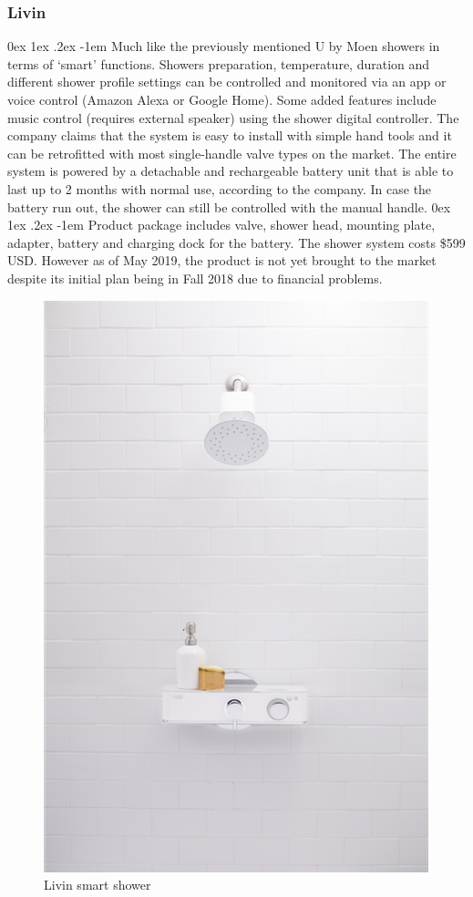 \documentclass[12pt, a4paper]{article}
\makeatletter
\renewcommand\paragraph{\@startsection{paragraph}{5}{\parindent}%
  {0ex \@plus1ex \@minus.2ex}%
  {-1em}%
  {\normalfont\normalsize\bfseries}}
\makeatother
\begin{document}
            \subsubsection{Livin\cite{livin}}
                \paragraph{}
                    Much like the previously mentioned U by Moen showers in terms of ‘smart’ functions. Showers preparation, 
                    temperature, duration and different shower profile settings can be controlled and monitored via an app or 
                    voice control (Amazon Alexa or Google Home). Some added features include music control (requires external 
                    speaker) using the shower digital controller. The company claims that the system is easy to install with 
                    simple hand tools and it can be retrofitted with most single-handle valve types on the market. The entire 
                    system is powered by a  detachable and rechargeable battery unit that is able to last up to 2 months with 
                    normal use, according to the company. In case the battery run out, the shower can still be controlled with 
                    the manual handle.
                \paragraph{}
                    Product package includes valve, shower head, mounting plate, adapter, battery and charging dock for the battery. 
                    The shower system costs \$599 USD. However as of May 2019, the product is not yet brought to the market despite 
                    its initial plan being in Fall 2018 due to financial problems.
                    \begin{figure}[H]
                        \centering
                        \includegraphics[width=0.4\linewidth]{img/LivinPhoto.png}
                        \caption{Livin smart shower}
                    \end{figure}
\end{document}
